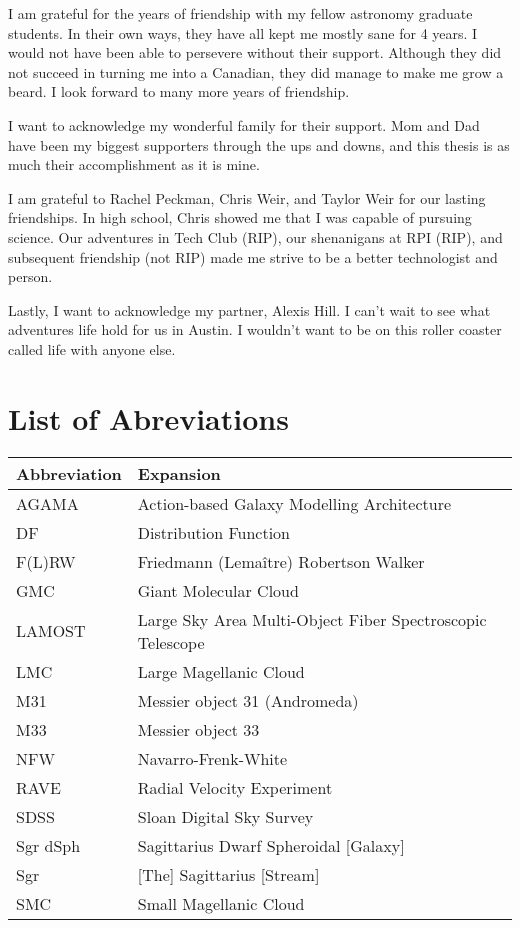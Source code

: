 I am grateful for the years of friendship with my fellow astronomy graduate students. In their own ways, they have all kept me mostly sane for 4 years. I would not have been able to persevere without their support. Although they did not succeed in turning me into a Canadian, they did manage to make me grow a beard. I look forward to many more years of friendship.

I want to acknowledge my wonderful family for their support. Mom and Dad have been my biggest supporters through the ups and downs, and this thesis is as much their accomplishment as it is mine. 

I am grateful to Rachel Peckman, Chris Weir, and Taylor Weir for our lasting friendships. In high school, Chris showed me that I was capable of pursuing science. Our adventures in Tech Club (RIP), our shenanigans at RPI (RIP), and subsequent friendship (not RIP) made me strive to be a better technologist and person.

Lastly, I want to acknowledge my partner, Alexis Hill. I can't wait to see what adventures life hold for us in Austin. I wouldn't want to be on this roller coaster called life with anyone else.



\singlespacing \afterpreface \doublespacing

\chapter*{List of Abreviations}
\begin{longtable}{ll} 
\hline
Abbreviation & Expansion \\ \hline
\textsc{AGAMA} & Action-based Galaxy Modelling Architecture \\
DF & Distribution Function \\
F(L)RW & Friedmann (Lema\^itre) Robertson Walker\\
GMC    & Giant Molecular Cloud\\
LAMOST & Large Sky Area Multi-Object Fiber Spectroscopic Telescope \\
LMC & Large Magellanic Cloud\\
M31 & Messier object 31 (Andromeda) \\
M33 & Messier object 33\\
NFW & Navarro-Frenk-White\\
RAVE & Radial Velocity Experiment \\
SDSS & Sloan Digital Sky Survey\\
Sgr dSph & Sagittarius Dwarf Spheroidal [Galaxy]\\
Sgr  & [The] Sagittarius [Stream]\\ 
SMC  & Small Magellanic Cloud  \\ \hline
\end{longtable}

